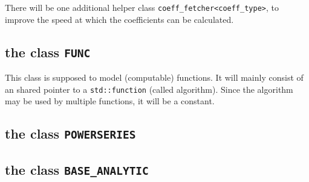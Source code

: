 \documentclass{article}
\newcommand{\func}[1]{\texttt{#1}\xspace}
\begin{document}
There will be one additional helper class \func{coeff\_fetcher<coeff\_type>}, to improve the speed at which the coefficients can be calculated.

\subsection{the class \texttt{FUNC}}

This class is supposed to model (computable) functions. It will mainly consist of an shared pointer to a \texttt{std::function} (called algorithm). Since the algorithm may be used by multiple functions, it will be a constant.

\subsection{the class \texttt{POWERSERIES}}

\subsection{the class \texttt{BASE\_ANALYTIC}}
\end{document}
